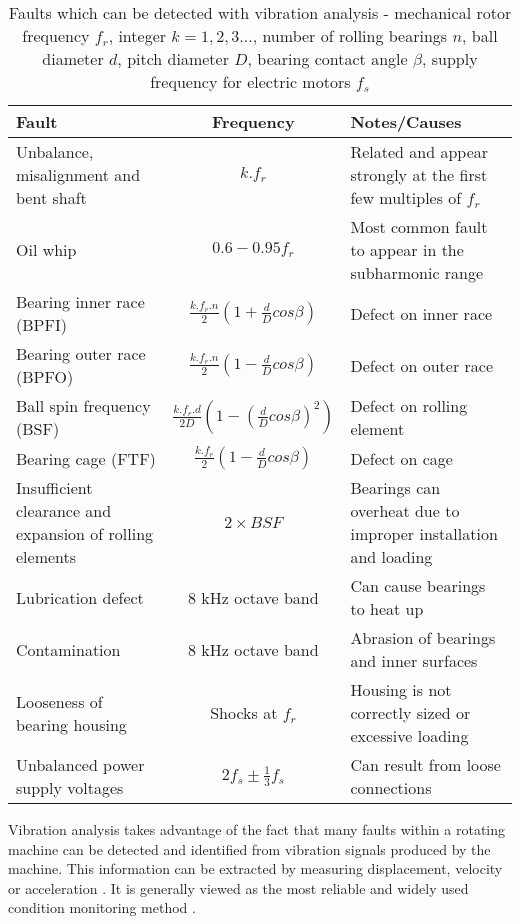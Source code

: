 \begin{table}
    \renewcommand{\arraystretch}{1.4}
	\begin{center}
		\begin{tabularx}{\textwidth}{XcX}%
			\toprule
			\textbf{Fault} & \textbf{Frequency} & \textbf{Notes/Causes} \\
			\midrule
			Unbalance, misalignment and bent shaft & $k.f_r$ & Related and appear strongly at the first few multiples of $f_r$ \\
			Oil whip & $0.6 - 0.95f_r$ & Most common fault to appear in the subharmonic range \\
			Bearing inner race (BPFI)& $\frac{k.f_{r}.n}{2}(1+\frac{d}{D}cos\beta)$ & Defect on inner race \\
			Bearing outer race (BPFO)& $\frac{k.f_{r}.n}{2}(1-\frac{d}{D}cos\beta)$ & Defect on outer race\\ 
			Ball spin frequency (BSF) & $\frac{k.f_{r}.d}{2D}(1-(\frac{d}{D}cos\beta)^2)$ & Defect on rolling element \\
			Bearing cage (FTF) & $\frac{k.f_{r}}{2}(1-\frac{d}{D}cos\beta)$ & Defect on cage\\
			Insufficient clearance and expansion of rolling elements & $2\times BSF$ & Bearings can overheat due to improper installation and loading \\
			Lubrication defect & 8 kHz octave band & Can cause bearings to heat up \\
			Contamination & 8 kHz octave band & Abrasion of bearings and inner surfaces \\
			Looseness of bearing housing & Shocks at $f_r$ & Housing is not correctly sized or excessive loading\\
			Unbalanced power supply voltages & $2f_s \pm \frac{1}{3}f_s$ & Can result from loose connections \\
			
			\bottomrule
		\end{tabularx}
		\caption{Faults which can be detected with vibration analysis - mechanical rotor frequency $f_r$, integer $k = 1, 2, 3...$, number of rolling bearings $n$, ball diameter $d$, pitch diameter $D$, bearing contact angle $\beta$, supply frequency for electric motors $f_s$ \cite{CM_randall}\cite{CM_mcsa_vib}\cite{ISO13373-3}\cite{ISO13373-9}}
		\label{tab:vibfaults}%
	\end{center}
\end{table}

Vibration analysis takes advantage of the fact that many faults within a rotating machine can be detected and identified from vibration signals produced by the machine.
This information can be extracted by measuring displacement, velocity or acceleration \cite{CM_randall}.
It is generally viewed as the most reliable and widely used condition monitoring method \cite{CM_mcsa_vib}.
\par


